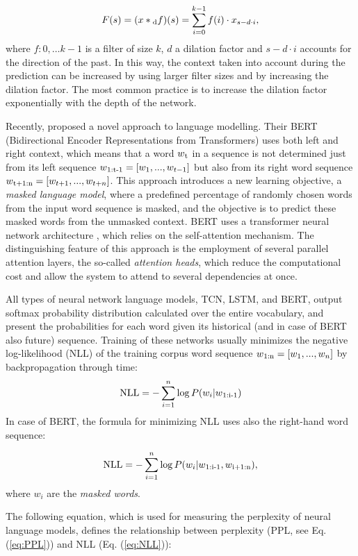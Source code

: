 \documentclass{clv3}
\begin{document}
\[F(s) = (x * \textsubscript{d}f)(s) = \sum_{i=0}^{k-1} f(i) \cdot x_{s-d\cdot i},\] where $f: 0,\ldots {k-1}$ is a filter of size $k$, $d$ a dilation factor and $s-d\cdot i$ accounts for the direction of the past. In this way, the context taken into account during the prediction can be increased by using larger filter sizes and by increasing the dilation factor. The most common practice is to increase the dilation factor exponentially with the depth of the network.

Recently,  \citet{devlin2018bert} proposed a novel approach to language modelling. Their BERT (Bidirectional Encoder Representations from Transformers) uses both left and right context, which means that a word $w\textsubscript{t}$ in a sequence is not determined just from its left sequence $w\textsubscript{1:{t-1}} = [w_1,...,w_{t-1}]$ but also from its right word sequence $w\textsubscript{t+1:n} = [w_{t+1},...,w_{t+n}]$. This approach introduces a new learning objective, a \textit{masked language model}, where a predefined percentage of randomly chosen words from the input word sequence is masked, and the objective is to predict these masked words from the unmasked context. BERT uses a transformer neural network architecture \citep{vaswani2017attention}, which relies on the self-attention mechanism. The distinguishing feature of this approach is the employment of several parallel attention layers, the so-called \textit{attention heads}, which reduce the computational cost and allow the system to attend to several dependencies at once.

All types of neural network language models, TCN, LSTM, and BERT, output softmax probability distribution calculated over the entire vocabulary, and present the probabilities for each word given its historical (and in case of BERT also future) sequence. Training of these networks usually minimizes the negative log-likelihood (NLL) of the training corpus word sequence $w\textsubscript{1:n} = [w_1,...,w_n]$ by backpropagation through time:
\begin{equation}
\textrm{NLL} = -\sum_{i=1}^{n}\log{P(w_i|w\textsubscript{1:i-1})}
\label{eq:NLL}
\end{equation}
In case of BERT, the formula for minimizing NLL uses also the right-hand  word sequence:

\[\textrm{NLL} = -\sum_{i=1}^{n}\log{P(w_i|w\textsubscript{1:i-1},  w\textsubscript{i+1:n})},\]where $w_i$ are the \textit{masked words}. 

The following equation, which is used for measuring the perplexity of neural language models, defines the relationship between perplexity (PPL, see Eq. (\ref{eq:PPL})) and NLL (Eq. (\ref{eq:NLL})):
\end{document}
